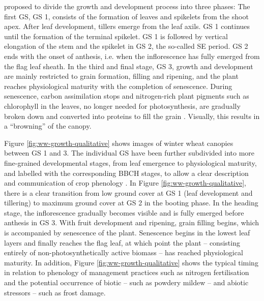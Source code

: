 \cite{kirby_analysis_1988} proposed to divide the growth and development process into three phases: The first \gls{GS}, \gls{GS} 1, consists of the formation of leaves and spikelets from the shoot apex. After leaf development, tillers emerge from the leaf axils. \gls{GS} 1 continues until the formation of the terminal spikelet. \gls{GS} 1 is followed by vertical elongation of the stem and the spikelet in \gls{GS} 2, the so-called \gls{SE} period. \gls{GS} 2 ends with the onset of anthesis, i.e. when the inflorescence has fully emerged from the flag leaf sheath. In the third and final stage, \gls{GS} 3, growth and development are mainly restricted to grain formation, filling and ripening, and the plant reaches physiological maturity with the completion of senescence. During senescence, carbon assimilation stops and nitrogen-rich plant pigments such as chlorophyll in the leaves, no longer needed for photosynthesis, are gradually broken down and converted into proteins to fill the grain \citep{thomas_stay-green_2014}. Visually, this results in a ``browning'' of the canopy.

Figure \ref{fig:ww-growth-qualitative} shows images of winter wheat canopies between \gls{GS} 1 and 3. The individual \gls{GS} have been further subdivided into more fine-grained developmental stages, from leaf emergence to physiological maturity, and labelled with the corresponding \gls{BBCH} stages, to allow a clear description and communication of crop phenology \citep{lancashire_uniform_1991}. In Figure \ref{fig:ww-growth-qualitative}, there is a clear transition from low ground cover at \gls{GS} 1 (leaf development and tillering) to maximum ground cover at \gls{GS} 2 in the booting phase. In the heading stage, the inflorescence gradually becomes visible and is fully emerged before anthesis in \gls{GS} 3. With fruit development and ripening, grain filling begins, which is accompanied by senescence of the plant. Senescence begins in the lowest leaf layers and finally reaches the flag leaf, at which point the plant -- consisting entirely of non-photosynthetically active biomass -- has reached physiological maturity. In addition, Figure \ref{fig:ww-growth-qualitative} shows the typical timing in relation to phenology of management practices such as nitrogen fertilisation and the potential occurrence of biotic -- such as powdery mildew -- and abiotic stressors -- such as frost damage.

